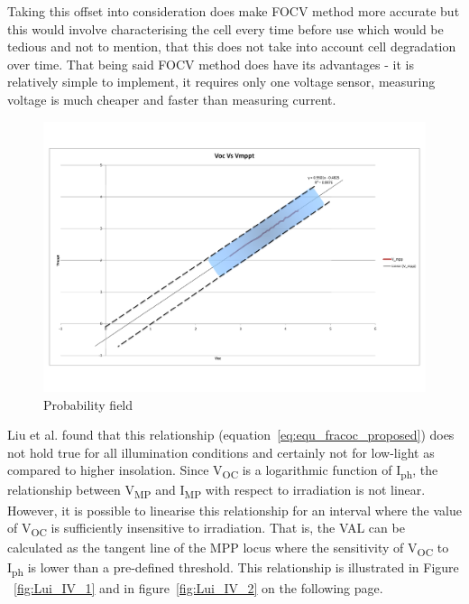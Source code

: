 Taking this offset into consideration does make \ac{FOCV} method more accurate but this would involve characterising the cell every time before use which would be tedious and not to mention, that this does not take into account cell degradation over time. That being said \ac{FOCV} method does have its advantages - it is relatively simple to implement, it requires only one voltage sensor, measuring voltage is much cheaper and faster than measuring current.\\
\begin{figure}[H]
  \begin{center}
	  \includegraphics[width=1.1\textwidth]{images/Probability_field}
	  \caption{Probability field }
	  \label{fig:Probability_field}
  \end{center}
\end{figure}

Liu et al.\cite{liu2011fast} found that this relationship (equation~\ref{eq:equ_fracoc_proposed}) does not hold true for all illumination conditions and certainly not for low-light as compared to higher insolation. Since V\textsubscript{OC} is a logarithmic function of I\textsubscript{ph}, the relationship between  V\textsubscript{MP} and I\textsubscript{MP} with respect to irradiation is not linear. However, it is possible to linearise this relationship for an interval where the value of V\textsubscript{OC} is sufficiently insensitive to irradiation. That is, the  \ac{VAL} can be calculated as the tangent line of the \ac{MPP} locus where the sensitivity of V\textsubscript{OC} to I\textsubscript{ph} is lower than a pre-defined threshold. This relationship is illustrated in Figure ~\ref{fig:Lui_IV_1} and in figure~\ref{fig:Lui_IV_2} on the following page.\\
  
